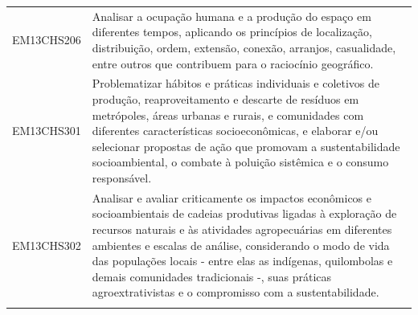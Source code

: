 \documentclass[12pt]{extarticle}
\begin{document}
\begin{longtable}{ll}
EM13CHS206 & Analisar a ocupação humana e a produção do espaço em diferentes tempos, aplicando os princípios de localização, distribuição, ordem, extensão, conexão, arranjos, casualidade, entre outros que contribuem para o raciocínio geográfico.                                                                                                                                                                                                                                                                                                                                                                                                                                                                                                                                                                              \\
\rowcolor[HTML]{E0F7FA} 
EM13CHS301 & Problematizar hábitos e práticas individuais e coletivos de produção, reaproveitamento e descarte de resíduos em metrópoles, áreas urbanas e rurais, e comunidades com diferentes características socioeconômicas, e elaborar e/ou selecionar propostas de ação que promovam a sustentabilidade socioambiental, o combate à poluição sistêmica e o consumo responsável.                                                                                                                                                                                                                                                                                                                                                                                                                                               \\
\rowcolor[HTML]{FFF} 
EM13CHS302 & Analisar e avaliar criticamente os impactos econômicos e socioambientais de cadeias produtivas ligadas à exploração de recursos naturais e às atividades agropecuárias em diferentes ambientes e escalas de análise, considerando o modo de vida das populações locais - entre elas as indígenas, quilombolas e demais comunidades tradicionais -, suas práticas agroextrativistas e o compromisso com a sustentabilidade.                                                                                                                                                                                                                                                                                                                                                                                            \\
\rowcolor[HTML]{E0F7FA} 

\end{longtable}
\end{document}
